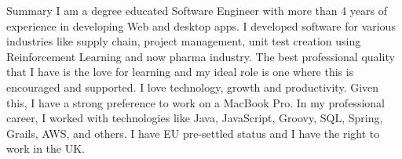 \documentclass[]{mcdowellcv}
\begin{document}
   \makeheader

  \begin{cvsection}{Summary}
		I am a degree educated Software Engineer with more than 4 years of experience in developing Web and desktop apps. I developed software for various industries like supply chain, project management, unit test creation using Reinforcement Learning and now pharma industry. The best professional quality that I have is the love for learning and my ideal role is one where this is encouraged and supported. I love technology, growth and productivity. Given this, I have a strong preference to work on a MacBook Pro. In my professional career, I worked with technologies like Java, JavaScript, Groovy, SQL, Spring, Grails, AWS, and others.
I have EU pre-settled status and I have the right to work in the UK.
  \end{cvsection}
\end{document}
